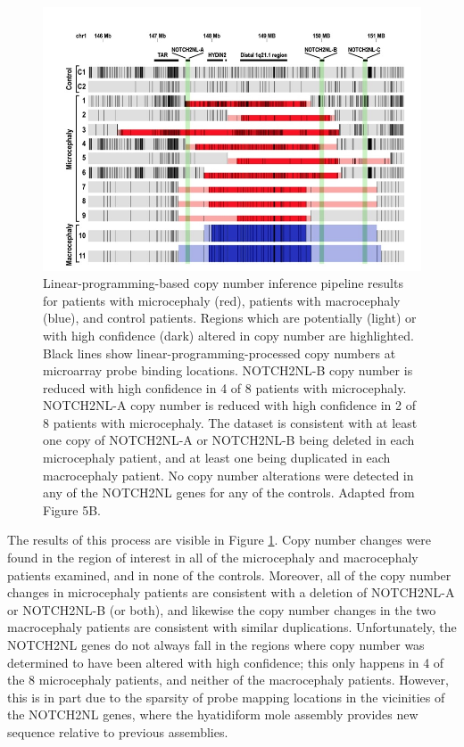 \documentclass[11pt,proposal]{ucthesis}
\begin{document}
\begin{figure}[ht]
    \centering
    \includegraphics[width=1.0\textwidth]{figures/notch2nl.png}
    \caption{Linear-programming-based copy number inference pipeline results for patients with microcephaly (red), patients with macrocephaly (blue), and control patients. Regions which are potentially (light) or with high confidence (dark) altered in copy number are highlighted. Black lines show linear-programming-processed copy numbers at microarray probe binding locations. NOTCH2NL-B copy number is reduced with high confidence in 4 of 8 patients with microcephaly. NOTCH2NL-A copy number is reduced with high confidence in 2 of 8 patients with microcephaly. The dataset is consistent with at least one copy of NOTCH2NL-A or NOTCH2NL-B being deleted in each microcephaly patient, and at least one being duplicated in each macrocephaly patient. No copy number alterations were detected in any of the NOTCH2NL genes for any of the controls. Adapted from \cite{jacobs2014recently} Figure 5B.}
    \label{fig:notch2nl}
\end{figure}

The results of this process are visible in Figure \ref{fig:notch2nl}. Copy number changes were found in the region of interest in all of the microcephaly and macrocephaly patients examined, and in none of the controls. Moreover, all of the copy number changes in microcephaly patients are consistent with a deletion of NOTCH2NL-A or NOTCH2NL-B (or both), and likewise the copy number changes in the two macrocephaly patients are consistent with similar duplications. Unfortunately, the NOTCH2NL genes do not always fall in the regions where copy number was determined to have been altered with high confidence; this only happens in 4 of the 8 microcephaly patients, and neither of the macrocephaly patients. However, this is in part due to the sparsity of probe mapping locations in the vicinities of the NOTCH2NL genes, where the hyatidiform mole assembly provides new sequence relative to previous assemblies.
\end{document}
